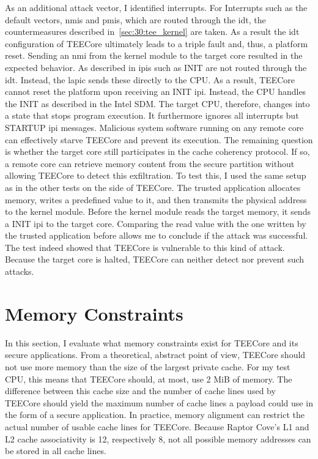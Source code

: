 As an additional attack vector, I identified interrupts. For Interrupts such as
the default vectors, \glspl{nmi} and \glspl{pmi}, which are routed through the
\gls{idt}, the countermeasures described in~\ref{sec:30:tee_kernel} are taken.
As a result the \gls{idt} configuration of TEECore ultimately leads to a triple
fault and, thus, a platform reset. Sending an \gls{nmi} from the kernel module
to the target core resulted in the expected behavior. As described in
 \glspl{ipi} such as INIT are not routed through the \gls{idt}.
Instead, the \gls{lapic} sends these directly to the CPU. As a result, TEECore
cannot reset the platform upon receiving an INIT \gls{ipi}. Instead, the CPU
handles the INIT as described in the Intel SDM. The target CPU, therefore,
changes into a state that stops program execution. It furthermore ignores all
interrupts but STARTUP \gls{ipi} messages. Malicious system software running on
any remote core can effectively starve TEECore and prevent its execution. The
remaining question is whether the target core still participates in the cache
coherency protocol. If so, a remote core can retrieve memory content from the
secure partition without allowing TEECore to detect this exfiltration. To test
this, I used the same setup as in the other tests on the side of TEECore. The
trusted application allocates memory, writes a predefined value to it, and then
transmits the physical address to the kernel module. Before the kernel module
reads the target memory, it sends a INIT \gls{ipi} to the target core. Comparing
the read value with the one written by the trusted application before allows me
to conclude if the attack was successful. The test indeed showed that TEECore is
vulnerable to this kind of attack. Because the target core is halted, TEECore
can neither detect nor prevent such attacks.

\section{Memory Constraints}
\label{eval:mem_constraints}
In this section, I evaluate what memory constraints exist for TEECore and its
secure applications. From a theoretical, abstract point of view, TEECore should
not use more memory than the size of the largest private cache. For my test CPU,
this means that TEECore should, at most, use 2 MiB of memory. The difference
between this cache size and the number of cache lines used by TEECore should
yield the maximum number of cache lines a payload could use in the form of a
secure application. In practice, memory alignment can restrict the actual number
of usable cache lines for TEECore. Because Raptor Cove's L1 and L2 cache
associativity is 12, respectively 8, not all possible memory addresses can be
stored in all cache lines.\\

